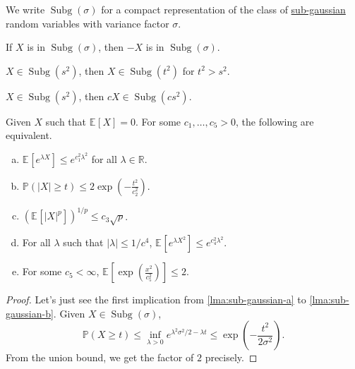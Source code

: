\begin{notation}
	We write \(\mathop{\mathrm{Subg}}(\sigma ) \) for a compact representation of the class of \hyperref[def:sub-gaussian]{sub-gaussian} random variables with variance factor \(\sigma \).
\end{notation}

\begin{remark}
	If \(X\) is in \(\mathop{\mathrm{Subg}}(\sigma ) \), then \(-X\) is in \(\mathop{\mathrm{Subg}}(\sigma ) \).
\end{remark}

\begin{remark}
	\(X\in \mathop{\mathrm{Subg}}(s^2) \), then \(X\in \mathop{\mathrm{Subg}}(t^2) \) for \(t^2 > s^2\).
\end{remark}

\begin{remark}
	\(X\in \mathop{\mathrm{Subg}}(s^2) \), then \(cX\in \mathop{\mathrm{Subg}}(cs^2) \).
\end{remark}

\begin{lemma}\label{lma:sub-gaussian}
	Given \(X\) such that \(\mathbb{E}_{}\left[X \right] =0\). For some \(c_1, \dots , c_5 > 0\), the following are equivalent.
	\begin{enumerate}[(a)]
		\item\label{lma:sub-gaussian-a} \(\mathbb{E}_{}\left[e^{\lambda X} \right] \leq e^{c_1^2 \lambda ^2}\) for all \(\lambda \in \mathbb{R} \).
		\item\label{lma:sub-gaussian-b} \(\mathbb{P} (\vert X \vert \geq t) \leq 2 \exp \left( - \frac{t^2}{c_2^2} \right) \).
		\item\label{lma:sub-gaussian-c} \(\left( \mathbb{E}_{}\left[\vert X \vert ^p \right]  \right)^{1 / p} \leq c_3 \sqrt{p}  \).
		\item\label{lma:sub-gaussian-d} For all \(\lambda \) such that \(\vert \lambda  \vert \leq 1 / c^4 \), \(\mathbb{E}_{}\left[e^{\lambda X^2} \right] \leq e^{c_4^2 \lambda ^2} \).
		\item\label{lma:sub-gaussian-e} For some \(c_5 < \infty \), \(\mathbb{E}_{}\left[\exp \left( \frac{x^2}{c_5^2} \right)  \right] \leq 2\).
	\end{enumerate}
\end{lemma}
\begin{proof}
	Let's just see the first implication from \autoref{lma:sub-gaussian-a} to \autoref{lma:sub-gaussian-b}. Given \(X \in \mathop{\mathrm{Subg}}(\sigma ) \),
	\[
		\mathbb{P} (X\geq t) \leq \inf _{\lambda > 0} e^{\lambda ^2 \sigma ^2 / 2 - \lambda t} \leq \exp (-\frac{t^2}{2\sigma ^2}).
	\]
	From the union bound, we get the factor of \(2\) precisely.
\end{proof}

